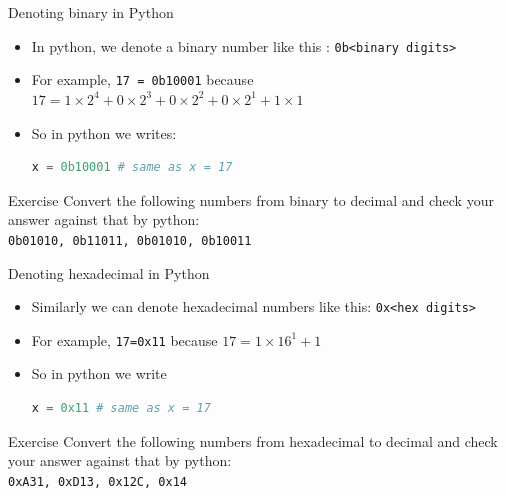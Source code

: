 \documentclass[10pt,xcolor={table,dvipsnames},t]{beamer}
\begin{document}
\begin{frame}[fragile]{Denoting binary in Python}
  \begin{itemize}
    \item In python, we denote a binary number like this : \texttt{0b<binary digits>}
    \item For example, \texttt{17 = 0b10001} because $17 = 1\times 2^4 + 0 \times 2^3 + 0 \times 2^2 + 0 \times 2^1 + 1 \times 1$
    
    \item So in python we writes:
\begin{lstlisting}[language=python]
x = 0b10001 # same as x = 17
\end{lstlisting}
  \end{itemize}
  \begin{exampleblock}{Exercise}
    Convert the following numbers from binary to decimal and check your answer against that by python:\\
    \texttt{0b01010, 0b11011, 0b01010, 0b10011}
  \end{exampleblock}
\end{frame}

\begin{frame}[fragile]{Denoting hexadecimal in Python}
  \begin{itemize}
    \item Similarly we can denote hexadecimal numbers like this: \texttt{0x<hex digits>}
    \item For example, \texttt{17=0x11} because $17 = 1 \times 16^1 + 1$
    \item So in python we write
\begin{lstlisting}[language=python]
x = 0x11 # same as x = 17
\end{lstlisting}
  \end{itemize}
  \begin{exampleblock}{Exercise}
    Convert the following numbers from hexadecimal to decimal and check your answer against that by python:\\
    \texttt{0xA31, 0xD13, 0x12C, 0x14}
  \end{exampleblock}
\end{frame}
\end{document}
